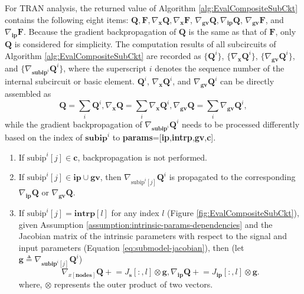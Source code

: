 For TRAN analysis, the returned value of Algorithm \ref{alg:EvalCompositeSubCkt} contains the following eight items:
$\bm{Q}, \bm{F}, \nabla_{\bm{x}}\bm{Q}, \nabla_{\bm{x}}\bm{F}$,
$\nabla_{\textbf{gv}}\bm{Q}, \nabla_{\textbf{ip}}\bm{Q}$,
$\nabla_{\textbf{gv}}\bm{F}$, and $\nabla_{\textbf{ip}}\bm{F}$.
Because the gradient backpropagation of $\bm{Q}$ is the same as that of $\bm{F}$, only $\bm{Q}$ is considered for simplicity.
The computation results of all subcircuits of Algorithm \ref{alg:EvalCompositeSubCkt} are recorded as $\{\bm{Q}^{i}\}$, $\{\nabla_{\bm{x}}\bm{Q}^{i}\}$, $\{\nabla_{\textbf{gv}}\bm{Q}^{i}\}$, and $\{\nabla_{\textbf{subip}^i}\bm{Q}^{i}\}$, where the superscript $i$ denotes the sequence number of the internal subcircuit or basic element. $\bm{Q}^{i}$, $\nabla_{\bm{x}}\bm{Q}^{i}$, and $\nabla_{\textbf{gv}}\bm{Q}^{i}$ can be directly assembled as
\[
\bm{Q} = \sum_i \bm{Q}^{i},
\nabla_{\bm{x}}\bm{Q} = \sum_i \nabla_{\bm{x}}\bm{Q}^{i},
\nabla_{\textbf{gv}}\bm{Q} = \sum_i \nabla_{\textbf{gv}}\bm{Q}^{i},
\]
while the gradient backpropagation of $\nabla_{\textbf{subip}^i}\bm{Q}^{i}$ needs to be processed differently based on the index of $\textbf{subip}^i$ to \textbf{params}=[\textbf{ip},\textbf{intrp},\textbf{gv},\textbf{c}].

\begin{enumerate}[partopsep=0pt,itemsep=0pt,parsep=0pt]
\item If $\text{subip}^i[j]\in\textbf{c}$, backpropagation is not performed.
\item If $\text{subip}^i[j]\in\textbf{ip}\cup\textbf{gv}$, then $\nabla_{\text{subip}^i[j]}\bm{Q}^i$ is propagated to the corresponding $\nabla_\textbf{ip}\bm{Q}$ or $\nabla_\textbf{gv}\bm{Q}$.
\item If $\text{subip}^i[j]=\textbf{intrp}[l]$ for any index $l$ (Figure \ref{fig:EvalCompositeSubCkt}), given Assumption \ref{assumption:intrinsic-params-dependencies} and the Jacobian matrix of the intrinsic parameters with respect to the signal and input parameters (Equation \ref{eq:submodel-jacobian}), then (let $\bm{g}\triangleq\nabla_{\textbf{subip}^i[j]}\bm{Q}^{i}$)
\begin{equation}\label{eq:intrinsic-params-backward}
\nabla_{x[\textbf{nodes}]}\bm{Q}\mathrel{+}=J_{\textbf{s}}[:,l]\otimes\bm{g},
\nabla_{\textbf{ip}}\bm{Q}\mathrel{+}=J_{\textbf{ip}}[:,l]\otimes\bm{g}.
\end{equation}
where, $\otimes$ represents the outer product of two vectors.
\end{enumerate}

